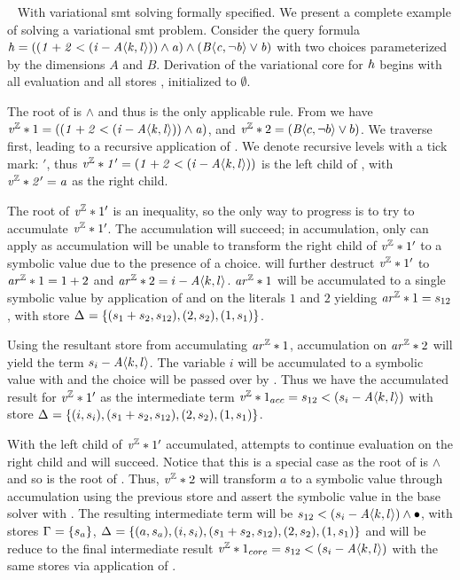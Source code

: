 ~\label{section:vsmt:example}
%
With variational \ac{smt} solving formally specified. We present a complete
example of solving a variational \ac{smt} problem. Consider the query formula
\newline$\kf{\hV = ((1 + 2 < (i - \chc[A]{k,l})) \wedge a) \wedge
  (\chc[B]{c,\neg b} \vee b)}$ with two choices parameterized by the dimensions
$A$ and $B$. Derivation of the variational core for $\mathit{h}$ begins with all
evaluation and all stores \aStore{}, \eStore{} initialized to $\emptyset$.

The root of \hV{} is $\wedge$ and thus \evAnd{} is the only applicable rule.
From \evAnd{} we have $\eIL*{1} = \kf{((1 + 2 < (i - \chc[A]{k,l})) \wedge a)}$,
and $\eIL*{2} = (\chc[B]{c,\neg b} \vee b)$. We traverse  first, leading
to a recursive application of \evAnd{}. We denote recursive levels with a tick
mark: $'$, thus $\kf{\eIL*{1}' = (1 + 2 < (i - \chc[A]{k,l}))}$ is the left
child of , with $\mathit{\mathit{v^{\mathbb{Z}}}*{2}' = a}$ as the right child.

The root of $\mathit{v^{\mathbb{Z}}}*{1}'$ is an inequality, so the only way to progress is to try
to accumulate $\mathit{v^{\mathbb{Z}}}*{1}'$. The accumulation will succeed; in accumulation, only
\acInEqV{} can apply as accumulation will be unable to transform the right child
of $\mathit{v^{\mathbb{Z}}}*{1}'$ to a symbolic value due to the presence of a choice. \acInEqV{}
will further destruct $\mathit{v^{\mathbb{Z}}}*{1}'$ to $\mathit{ar^{\mathbb{Z}}}*{1} = 1 + 2$ and $\eAR*{2} = i -
\chc[A]{k,l}$. $\mathit{ar^{\mathbb{Z}}}*{1}$ will be accumulated to a single symbolic value by
application of \acArithS{} and \acRef{} on the literals $1$ and $2$ yielding
$\mathit{ar^{\mathbb{Z}}}*{1} = s_{12}$, with store $\aStore{}=\set{(s_{1} + s_{2}, s_{12}),
  (2,s_{2}), (1,s_{1})}$.

Using the resultant store from accumulating $\mathit{ar^{\mathbb{Z}}}*{1}$, accumulation on
$\mathit{ar^{\mathbb{Z}}}*{2}$ will yield the term $s_{i} - \chc[A]{k,l}$. The variable $i$ will be
accumulated to a symbolic value with \acRef{} and the choice will be passed over
by \acChc{}. Thus we have the accumulated result for $\mathit{v^{\mathbb{Z}}}*{1}'$ as the
intermediate term $\eIL*{1}_{acc} = s_{12} < (s_{i} - \chc[A]{k,l})$ with store
$\aStore{}=\set{(i, s_{i}),(s_{1} + s_{2}, s_{12}), (2,s_{2}), (1,s_{1})}$.

With the left child of $\mathit{v^{\mathbb{Z}}}*{1}'$ accumulated, \evAnd{} attempts to continue
evaluation on the right child and will succeed. Notice that this is a special
case as the root of  is $\wedge$ and so is the root of \hV{}. Thus,
$\mathit{v^{\mathbb{Z}}}*{2}$ will transform $a$ to a symbolic value through accumulation using the
previous store and assert the symbolic value in the base solver with \evSym{}.
The resulting intermediate term will be $s_{12} < (s_{i} - \chc[A]{k,l}) \wedge
\unit{}$, with stores $\eStore{}=\set{s_{a}}$, $\aStore{}=\set{(a,s_{a}),(i,
  s_{i}),(s_{1} + s_{2}, s_{12}), (2,s_{2}), (1,s_{1})}$ and will be reduce to
the final intermediate result $\eIL*{1}_{core} = s_{12} < (s_{i} -
\chc[A]{k,l})$ with the same stores via application of \evAndR{}.

